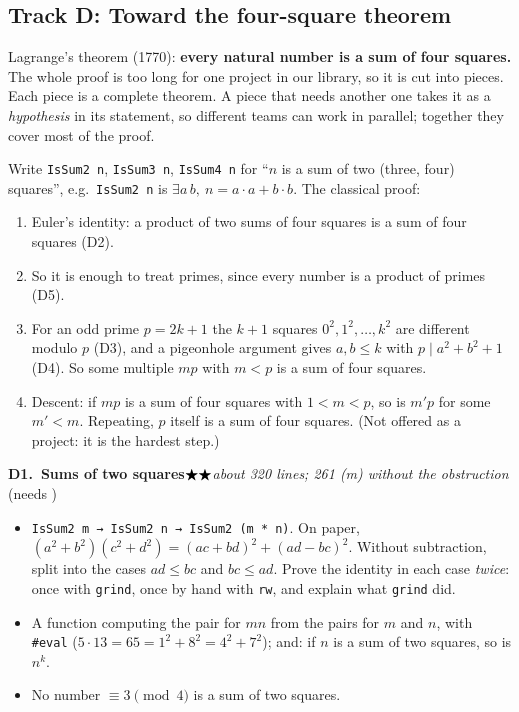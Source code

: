 \documentclass[11pt]{article}
\newcommand{\lean}[1]{\texttt{#1}}
\newcommand{\dvd}{\ensuremath{\mid}}
\newcommand{\stars}[1]{\ensuremath{%
  \ifcase#1\or\bigstar\or\bigstar\bigstar\or\bigstar\bigstar\bigstar\or
  \bigstar\bigstar\bigstar\bigstar\or\bigstar\bigstar\bigstar\bigstar\bigstar\fi}}
\newcommand{\topic}[5]{%
  \par\medskip\noindent\textbf{#1.\ #2}\hfill\quad\stars{#3}\enspace\textit{#4}%
  \ifx\relax#5\relax\else\enspace(needs #5)\fi\par\nopagebreak}
\begin{document}
\subsection*{Track D: Toward the four-square theorem}

Lagrange's theorem (1770): \textbf{every natural number is a sum of four squares.} The whole
proof is too long for one project in our library, so it is cut into pieces. Each piece is a
complete theorem. A piece that needs another one takes it as a \emph{hypothesis} in its
statement, so different teams can work in parallel; together they cover most of the proof.

Write \lean{IsSum2 n}, \lean{IsSum3 n}, \lean{IsSum4 n} for ``$n$ is a sum of two (three,
four) squares'', e.g.\ \lean{IsSum2 n} is $\exists a\, b,\ n = a\cdot a + b \cdot b$. The
classical proof:
\begin{enumerate}
\item Euler's identity: a product of two sums of four squares is a sum of four squares (D2).
\item So it is enough to treat primes, since every number is a product of primes (D5).
\item For an odd prime $p = 2k+1$ the $k+1$ squares $0^2, 1^2, \dots, k^2$ are different modulo
  $p$ (D3), and a pigeonhole argument gives $a, b \le k$ with $p \dvd a^2 + b^2 + 1$ (D4). So some
  multiple $mp$ with $m < p$ is a sum of four squares.
\item Descent: if $mp$ is a sum of four squares with $1 < m < p$, so is $m'p$ for some $m' < m$.
  Repeating, $p$ itself is a sum of four squares. (Not offered as a project: it is the hardest
  step.)
\end{enumerate}

\topic{D1}{Sums of two squares}{2}{about 320 lines; 261 (m) without the obstruction}{}
\begin{itemize}
\item \lean{IsSum2 m → IsSum2 n → IsSum2 (m * n)}. On paper,
  $(a^2+b^2)(c^2+d^2) = (ac+bd)^2 + (ad-bc)^2$. Without subtraction, split into the cases
  $ad \le bc$ and $bc \le ad$. Prove the identity in each case \emph{twice}: once with
  \lean{grind}, once by hand with \lean{rw}, and explain what \lean{grind} did.
\item A function computing the pair for $mn$ from the pairs for $m$ and $n$, with \lean{\#eval}
  ($5 \cdot 13 = 65 = 1^2 + 8^2 = 4^2 + 7^2$); and: if $n$ is a sum of two squares, so is $n^k$.
\item No number $\equiv 3 \pmod 4$ is a sum of two squares.
\end{itemize}
\end{document}
